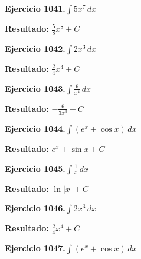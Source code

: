 \documentclass[10pt,a4paper]{article}
\begin{document}
\begin{ejbox}
\textbf{Ejercicio 1041.}\quad $\int 5x^{7}\,dx$
\end{ejbox}

\begin{solbox}
\textbf{Resultado:} \(\displaystyle \frac{5}{8}x^{8} + C\)
\end{solbox}

\newpage
\begin{ejbox}
\textbf{Ejercicio 1042.}\quad $\int 2x^{3}\,dx$
\end{ejbox}

\begin{solbox}
\textbf{Resultado:} \(\displaystyle \frac{2}{4}x^{4} + C\)
\end{solbox}

\begin{ejbox}
\textbf{Ejercicio 1043.}\quad $\int \frac{6}{x^{4}}\,dx$
\end{ejbox}

\begin{solbox}
\textbf{Resultado:} \(\displaystyle -\frac{6}{3x^{3}} + C\)
\end{solbox}

\begin{ejbox}
\textbf{Ejercicio 1044.}\quad $\int (e^x + \cos x)\,dx$
\end{ejbox}

\begin{solbox}
\textbf{Resultado:} \(\displaystyle e^x + \sin x + C\)
\end{solbox}

\newpage
\begin{ejbox}
\textbf{Ejercicio 1045.}\quad $\int \frac{1}{x}\,dx$
\end{ejbox}

\begin{solbox}
\textbf{Resultado:} \(\displaystyle \ln|x| + C\)
\end{solbox}

\begin{ejbox}
\textbf{Ejercicio 1046.}\quad $\int 2x^{3}\,dx$
\end{ejbox}

\begin{solbox}
\textbf{Resultado:} \(\displaystyle \frac{2}{4}x^{4} + C\)
\end{solbox}

\begin{ejbox}
\textbf{Ejercicio 1047.}\quad $\int (e^x + \cos x)\,dx$
\end{ejbox}
\end{document}
